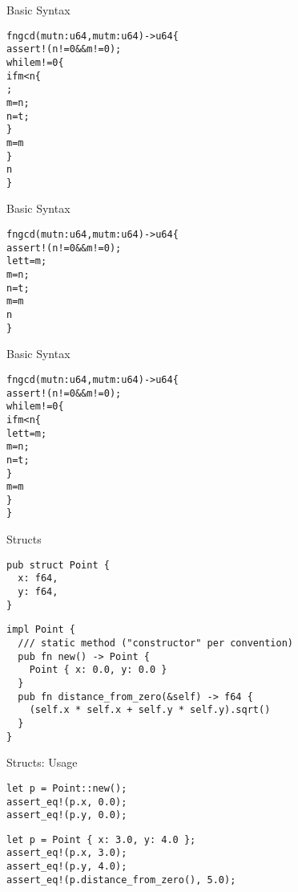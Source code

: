 
\begin{frame}[fragile]{Basic Syntax}
\begin{alltt}
fn gcd(mut n: u64, mut m: u64) -> u64 \{
    assert!(n != 0 && m != 0);
    while m != 0 \{
        if m < n \{
            ;
            m = n;
            n = t;
        \}
        m = m % n;
    \}
    n
\}
\end{alltt}
\end{frame}


\begin{frame}[fragile]{Basic Syntax}
\begin{alltt}
fn gcd(mut n: u64, mut m: u64) -> u64 \{
    assert!(n != 0 && m != 0);
            let t = m;
            m = n;
            n = t;
        \hi{\}}
        m = m % n;
    \hi{\}}
    n
\}
\end{alltt}
\end{frame}


\begin{frame}[fragile]{Basic Syntax}
\begin{alltt}
fn gcd(mut n: u64, mut m: u64) -> u64 \{
    assert!(n != 0 && m != 0);
    while m != 0 \{
        if m < n \{
            let t = m;
            m = n;
            n = t;
        \}
        m = m % n;
    \}
\}
\end{alltt}
\end{frame}


\begin{frame}[fragile]{Structs}
\begin{verbatim}
pub struct Point {
  x: f64,
  y: f64,
}
\end{verbatim}
\pause
\begin{verbatim}
impl Point {
  /// static method ("constructor" per convention)
  pub fn new() -> Point {
    Point { x: 0.0, y: 0.0 }
  }
  pub fn distance_from_zero(&self) -> f64 {
    (self.x * self.x + self.y * self.y).sqrt()
  }
}
\end{verbatim}
\end{frame}

\begin{frame}[fragile]{Structs: Usage}
\begin{verbatim}
let p = Point::new();
assert_eq!(p.x, 0.0);
assert_eq!(p.y, 0.0);
\end{verbatim}
\begin{verbatim}
let p = Point { x: 3.0, y: 4.0 };
assert_eq!(p.x, 3.0);
assert_eq!(p.y, 4.0);
assert_eq!(p.distance_from_zero(), 5.0);
\end{verbatim}
\end{frame}


